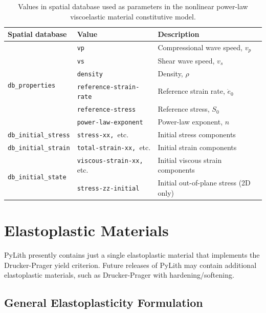 \noindent \begin{center}
\begin{table}[H]
\noindent \centering{}\caption{\label{tab:powerLaw}Values in spatial database used as parameters
in the nonlinear power-law viscoelastic material constitutive model.}
\begin{tabular}{|l|l|l|}
\hline 
\textbf{Spatial database} & \textbf{Value} & \textbf{Description}\tabularnewline
\hline 
\hline 
\multirow{6}{*}{\texttt{db\_properties}} & \texttt{vp} & Compressional wave speed, $v_{p}$\tabularnewline
\cline{2-3} 
 & \texttt{vs} & Shear wave speed, $v_{s}$\tabularnewline
\cline{2-3} 
 & \texttt{density} & Density, $\rho$\tabularnewline
\cline{2-3} 
 & \texttt{reference-strain-rate} & Reference strain rate, $\dot{e}_{0}$\tabularnewline
\cline{2-3} 
 & \texttt{reference-stress} & Reference stress, $S_{0}$\tabularnewline
\cline{2-3} 
 & \texttt{power-law-exponent} & Power-law exponent, $n$\tabularnewline
\hline 
\texttt{db\_initial\_stress} & \texttt{stress-xx, }etc. & Initial stress components\tabularnewline
\hline 
\texttt{db\_initial\_strain} & \texttt{total-strain-xx, }etc. & Initial strain components\tabularnewline
\hline 
\multirow{2}{*}{\texttt{db\_initial\_state}} & \texttt{viscous-strain-xx, }etc. & Initial viscous strain components\tabularnewline
\cline{2-3} 
 & \texttt{stress-zz-initial} & Initial out-of-plane stress (2D only)\tabularnewline
\hline 
\end{tabular}
\end{table}

\par\end{center}


\section{Elastoplastic Materials}

PyLith presently contains just a single elastoplastic material that
implements the Drucker-Prager yield criterion. Future releases of
PyLith may contain additional elastoplastic materials, such as Drucker-Prager
with hardening/softening.


\subsection{General Elastoplasticity Formulation}

